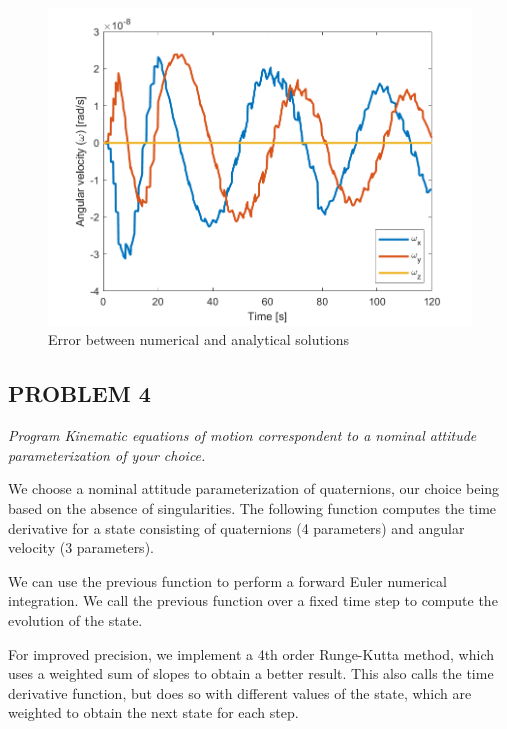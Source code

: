 \begin{figure}[H]
\centering
\includegraphics[scale=0.6]{Images/ps3_problem3.png}
\caption{Error between numerical and analytical solutions}
\label{fig:ps3_problem3}
\end{figure}


\subsection{PROBLEM 4}
\textit{Program Kinematic equations of motion correspondent to a nominal attitude parameterization of your choice.}

We choose a nominal attitude parameterization of quaternions, our choice being based on the absence of singularities. The following function computes the time derivative for a state consisting of quaternions (4 parameters) and angular velocity (3 parameters).



We can use the previous function to perform a forward Euler numerical integration. We call the previous function over a fixed time step to compute the evolution of the state.



For improved precision, we implement a 4th order Runge-Kutta method, which uses a weighted sum of slopes to obtain a better result. This also calls the time derivative function, but does so with different values of the state, which are weighted to obtain the next state for each step.




